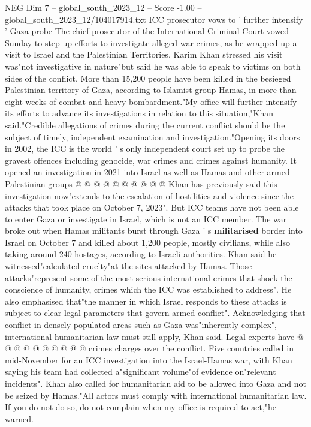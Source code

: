 \begin{textsample}{NEG Dim 7 – global\_south\_2023\_12 – Score -1.00 – global\_south\_2023\_12/104017914.txt}  \label{ex:f7_neg_199}
ICC prosecutor vows to ' further intensify ' Gaza probe The chief prosecutor of the International Criminal Court vowed Sunday to step up efforts to investigate alleged war crimes, as he wrapped up a visit to Israel and the Palestinian Territories.
Karim Khan stressed his visit was"not investigative in nature"but said he was able to speak to victims on both sides of the conflict.
More than 15,200 people have been killed in the besieged Palestinian territory of Gaza, according to Islamist group Hamas, in more than eight weeks of combat and heavy bombardment."My office will further intensify its efforts to advance its investigations in relation to this situation,"Khan said."Credible allegations of crimes during the current conflict should be the subject of timely, independent examination and investigation."Opening its doors in 2002, the ICC is the world ' s only independent court set up to probe the gravest offences including genocide, war crimes and crimes against humanity.
It opened an investigation in 2021 into Israel as well as Hamas and other armed Palestinian groups @ @ @ @ @ @ @ @ @ @ Khan has previously said this investigation now"extends to the escalation of hostilities and violence since the attacks that took place on October 7, 2023".
But ICC teams have not been able to enter Gaza or investigate in Israel, which is not an ICC member.
The war broke out when Hamas militants burst through Gaza ' s \textbf{militarised} border into Israel on October 7 and killed about 1,200 people, mostly civilians, while also taking around 240 hostages, according to Israeli authorities.
Khan said he witnessed"calculated cruelty"at the sites attacked by Hamas.
Those attacks"represent some of the most serious international crimes that shock the conscience of humanity, crimes which the ICC was established to address".
He also emphasised that"the manner in which Israel responds to these attacks is subject to clear legal parameters that govern armed conflict".
Acknowledging that conflict in densely populated areas such as Gaza was"inherently complex", international humanitarian law must still apply, Khan said.
Legal experts have @ @ @ @ @ @ @ @ @ @ crimes charges over the conflict.
Five countries called in mid-November for an ICC investigation into the Israel-Hamas war, with Khan saying his team had collected a"significant volume"of evidence on"relevant incidents".
Khan also called for humanitarian aid to be allowed into Gaza and not be seized by Hamas."All actors must comply with international humanitarian law.
If you do not do so, do not complain when my office is required to act,"he warned.

\end{textsample}
